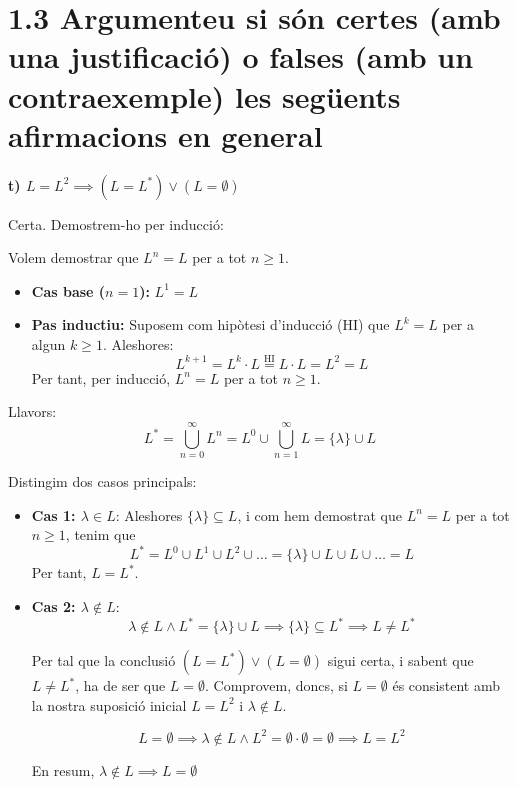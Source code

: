 \documentclass{article}
\begin{document}
\section*{1.3 Argumenteu si són certes (amb una justificació) o falses (amb un contraexemple) les següents afirmacions en general}

\textbf{t) $L = L^2 \implies (L = L^*) \vee (L = \emptyset)$}

Certa. Demostrem-ho per inducció:

Volem demostrar que $L^n = L$ per a tot $n \geq 1$.

\begin{itemize}
    \item \textbf{Cas base ($n = 1$):} $L^1 = L$
    \item \textbf{Pas inductiu:} Suposem com hipòtesi d'inducció (HI) que $L^k = L$ per a algun $k \geq 1$. Aleshores:
    \[
    L^{k+1} = L^k \cdot L \overset{\text{HI}}{=} L \cdot L = L^2 = L
    \]
    Per tant, per inducció, $L^n = L$ per a tot $n \geq 1$.
\end{itemize}

Llavors:
\[
L^* = \bigcup_{n=0}^{\infty} L^n = L^0 \cup \bigcup_{n=1}^{\infty} L = \{\lambda\} \cup L
\]

Distingim dos casos principals:

\begin{itemize}
    \item \textbf{Cas 1:  $\lambda \in L$}:  
    Aleshores $\{\lambda\} \subseteq L$, i com hem demostrat que $L^n = L$ per a tot $n \geq 1$, tenim que
    \[
    L^* = L^0 \cup L^1 \cup L^2 \cup \dots = \{\lambda\} \cup L \cup L \cup \dots = L
    \]
    Per tant, $ L = L^* $.

    \item \textbf{Cas 2: $\lambda \notin L$}:
\[
\lambda \notin  L \wedge L^* = \{\lambda\} \cup L   \implies \{\lambda\} \subseteq L^* \implies L \neq L^* 
\]

Per tal que la conclusió $(L = L^*) \vee (L = \emptyset)$ sigui certa, i sabent que $L \neq L^* $, ha de ser que $L = \emptyset$. Comprovem, doncs,  si $L = \emptyset$ és consistent amb la nostra suposició inicial $L = L^2$ i $\lambda \notin L$.

\[
 L = \emptyset \implies \lambda \notin L \wedge L^2 = \emptyset \cdot \emptyset = \emptyset  \implies L = L^2
 \]

En resum,  $\lambda \notin L \implies L = \emptyset$ 
\end {itemize}
\end{document}
